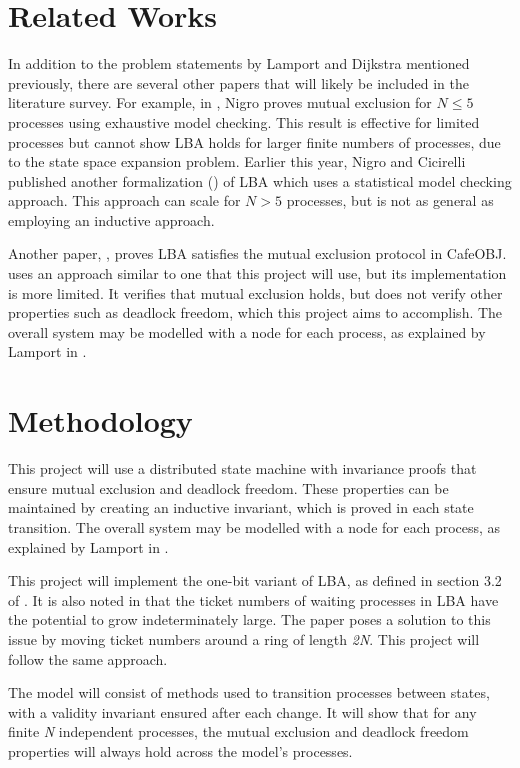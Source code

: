 \documentclass{article}
\theoremstyle{definition}
\begin{document}
\section{Related Works}

In addition to the problem statements by Lamport and Dijkstra mentioned previously, there are several other papers that will likely be included in the literature survey.
For example, in \cite{nigroCorrectnessVerificationMutual2024}, Nigro proves mutual exclusion for $ N \le 5 $ processes using exhaustive model checking.
This result is effective for limited processes but cannot show LBA holds for larger finite numbers of processes, due to the state space expansion problem.
Earlier this year, Nigro and Cicirelli published another formalization (\cite{nigroStatisticalModelChecking2026}) of LBA which uses a statistical model checking approach.
This approach can scale for $ N > 5 $ processes, but is not as general as employing an inductive approach.

Another paper, \cite{ogataFormalAnalysisBakery2008}, proves LBA satisfies the mutual exclusion protocol in CafeOBJ.
\cite{ogataFormalAnalysisBakery2008} uses an approach similar to one that this project will use, but its implementation is more limited. 
It verifies that mutual exclusion holds, but does not verify other properties such as deadlock freedom, which this project aims to accomplish.
The overall system may be modelled with a node for each process, as explained by Lamport in \cite{lamportDeconstructingBakeryBuild2022}.

\section{Methodology}

This project will use a distributed state machine with invariance proofs that ensure mutual exclusion and deadlock freedom.
These properties can be maintained by creating an inductive invariant, which is proved in each state transition.
The overall system may be modelled with a node for each process, as explained by Lamport in \cite{lamportDeconstructingBakeryBuild2022}.

This project will implement the one-bit variant of LBA, as defined in section 3.2 of \cite{lamport_mutual_1986}. 
It is also noted in \cite{wooNoteLamportsMutual1990} that the ticket numbers of waiting processes in LBA have the potential to grow indeterminately large.
The paper poses a solution to this issue by moving ticket numbers around a ring of length \emph{2N}. This project will follow the same approach.

The model will consist of methods used to transition processes between states, with a validity invariant ensured after each change. 
It will show that for any finite \emph{N} independent processes, the mutual exclusion and deadlock freedom properties will always hold across the model's processes.




\end{document}
